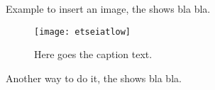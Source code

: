 Example to insert an image, the  shows bla bla.


\begin{figure}[htb]
  \centering
   \texttt{[image: etseiatlow]}
   \caption{Here goes the caption text.}
   \label{fig:etseiatlow2}
\end{figure}


Another way to do it, the  shows bla bla.






